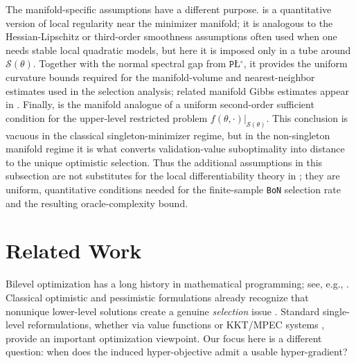 \documentclass{article}
\theoremstyle{normaltheorem}
\newcommand{\PLcirc}{\texttt{P\L$^\circ$}}
\newcommand{\calS}{\mathcal{S}}
\newcommand{\BoN}{\texttt{BoN}\xspace}
\begin{document}
The manifold-specific assumptions have a different purpose.  is a quantitative version of local
regularity near the minimizer manifold; it is analogous to the Hessian-Lipschitz or third-order smoothness assumptions
often used when one needs stable local quadratic models, but here it is imposed only in a tube around \(\calS(\theta)\).
Together with the normal spectral gap from \(\PLcirc\), it provides the uniform curvature bounds required for the
manifold-volume and nearest-neighbor estimates used in the selection analysis; related manifold Gibbs estimates appear in
\citet{masiha2025superquantile}. Finally,  is the manifold analogue of a uniform
second-order sufficient condition for the upper-level restricted problem \(f(\theta,\cdot)|_{\calS(\theta)}\). This
conclusion is vacuous in the classical singleton-minimizer regime, but in the non-singleton manifold regime it is what
converts validation-value suboptimality into distance to the unique optimistic selection. Thus the additional assumptions
in this subsection are not substitutes for the local differentiability theory in ; they are uniform,
quantitative conditions needed for the finite-sample \BoN selection rate and the resulting oracle-complexity bound.


\section{Related Work}\label{sec:related_work}
Bilevel optimization has a long history in mathematical programming; see, e.g.,
\citet{vicente1994bilevel,dempe2002foundations,colson2007overview,luo1996mathematical,dempe2020bilevel}.
Classical optimistic and pessimistic formulations already recognize that nonunique lower-level solutions create a genuine
\emph{selection} issue \citep{dempe2007new,ye1997exact,ye1997necessary}. Standard single-level reformulations, whether via
value functions or KKT/MPEC systems \citep{ye1995optimality,ye2010new,dempe2012kkt,zemkoho2021comparison}, provide an
important optimization viewpoint. Our focus here is a different question: when does the induced hyper-objective admit a
usable hyper-gradient?
\end{document}
